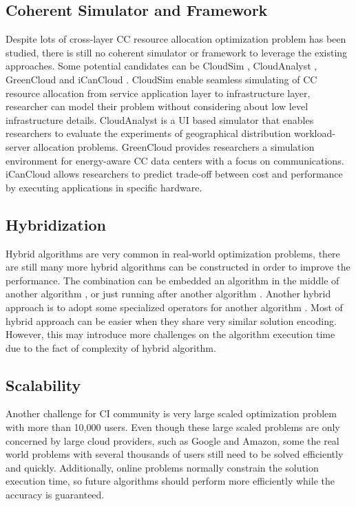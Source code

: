 \documentclass[onecolumn,10pt]{asme2ej}
\begin{document}
\subsection{Coherent Simulator and Framework}
Despite lots of cross-layer CC resource allocation optimization problem has been studied, there is still no coherent simulator or framework to leverage the existing approaches. Some potential candidates can be CloudSim \cite{calheiros2011cloudsim}, CloudAnalyst \cite{wickremasinghe2010cloudanalyst}, GreenCloud \cite{kliazovich2010greencloud} and iCanCloud \cite{nunez2012icancloud}. CloudSim enable seamless simulating of CC resource allocation from service application layer to infrastructure layer, researcher can model their problem without considering about low level infrastructure details. CloudAnalyst is a UI based simulator that enables researchers to evaluate the experiments of geographical distribution workload-server allocation problems. GreenCloud provides researchers a simulation environment for energy-aware CC data centers with a focus on communications. iCanCloud allows researchers to predict trade-off between cost and performance by executing applications in specific hardware. 

\subsection{Hybridization}
Hybrid algorithms are very common in real-world optimization problems, there are still many more hybrid algorithms can be constructed in order to improve the performance. The combination can be embedded an algorithm in the middle of another algorithm \cite{sharma2016demand}, or just running after another algorithm \cite{hajjem2016mmas}. Another hybrid approach is to adopt some specialized operators for another algorithm \cite{iturriaga2013parallel}. Most of hybrid approach can be easier when they share very similar solution encoding. However, this may introduce more challenges on the algorithm execution time due to the fact of complexity of hybrid algorithm.

\subsection{Scalability}
Another challenge for CI community is very large scaled optimization problem with more than 10,000 users. Even though these large scaled problems are only concerned by large cloud providers, such as Google and Amazon, some the real world problems with several thousands of users still need to be solved efficiently and quickly. Additionally, online problems normally constrain the solution execution time, so future algorithms should perform more efficiently while the accuracy is guaranteed.   
\end{document}
